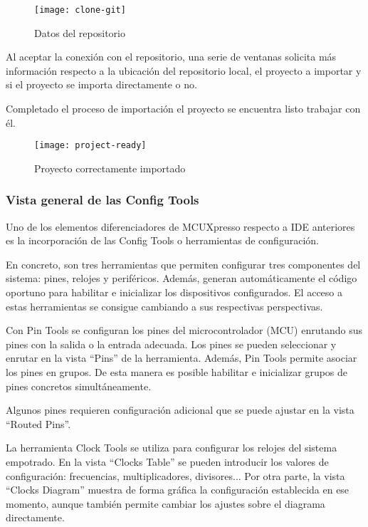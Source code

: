 \begin{figure}[!h]
  \centering
  \texttt{[image: clone-git]}
  \caption{Datos del repositorio} \label{fig:clone-git}
\end{figure}

Al aceptar la conexión con el repositorio, una serie de ventanas solicita más
información respecto a la ubicación del repositorio local, el proyecto a 
importar y si el proyecto se importa directamente o no.

Completado el proceso de importación el proyecto se encuentra listo 
trabajar con él.

\begin{figure}[!h]
  \centering
  \texttt{[image: project-ready]}
  \caption{Proyecto correctamente importado} \label{fig:project-ready}
\end{figure}

\subsubsection{Vista general de las Config Tools} \label{sec:config-tools}
Uno de los elementos diferenciadores de MCUXpresso respecto a IDE anteriores
es la incorporación de las Config Tools o herramientas de configuración.

En concreto, son tres herramientas que permiten configurar tres componentes
del sistema: pines, relojes y periféricos. Además, generan automáticamente el
código oportuno para habilitar e inicializar los dispositivos configurados. El
acceso a estas herramientas se consigue cambiando a sus respectivas perspectivas.

Con Pin Tools se configuran los pines del microcontrolador (MCU) enrutando
sus pines con la salida o la entrada adecuada. Los pines se pueden seleccionar y
enrutar en la vista ``Pins'' de la herramienta. Además, Pin Tools permite asociar
los pines en grupos. De esta manera es posible habilitar e inicializar grupos
de pines concretos simultáneamente.


Algunos pines requieren configuración adicional que se puede ajustar en la vista
``Routed Pins''.


La herramienta Clock Tools se utiliza para configurar los relojes del sistema
empotrado. En la vista ``Clocks Table'' se pueden introducir los valores de
configuración: frecuencias, multiplicadores, divisores... Por otra parte, la
vista ``Clocks Diagram'' muestra de forma gráfica la configuración establecida
en ese momento, aunque también permite cambiar los ajustes sobre el diagrama
directamente.

